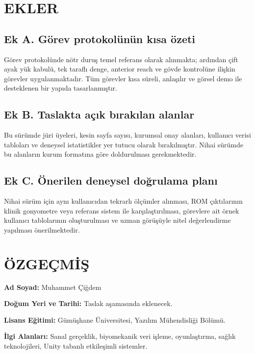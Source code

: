 \documentclass[12pt,a4paper,oneside]{report}
\newcommand{\thesisauthor}{Muhammet Çiğdem}
\begin{document}
\chapter{EKLER}

\section{Ek A. Görev protokolünün kısa özeti}
Görev protokolünde nötr duruş temel referans olarak alınmakta; ardından çift ayak yük kabulü, tek taraflı denge, anterior reach ve gövde kontrolüne ilişkin görevler uygulanmaktadır. Tüm görevler kısa süreli, anlaşılır ve görsel demo ile desteklenen bir yapıda tasarlanmıştır.

\section{Ek B. Taslakta açık bırakılan alanlar}
Bu sürümde jüri üyeleri, kesin sayfa sayısı, kurumsal onay alanları, kullanıcı verisi tabloları ve deneysel istatistikler yer tutucu olarak bırakılmıştır. Nihai sürümde bu alanların kurum formatına göre doldurulması gerekmektedir.

\section{Ek C. Önerilen deneysel doğrulama planı}
Nihai sürüm için aynı kullanıcıdan tekrarlı ölçümler alınması, ROM çıktılarının klinik gonyometre veya referans sistem ile karşılaştırılması, görevlere ait örnek kullanıcı tablolarının oluşturulması ve uzman görüşüyle nitel değerlendirme yapılması önerilmektedir.

\chapter{ÖZGEÇMİŞ}
\noindent\textbf{Ad Soyad:} \thesisauthor

\noindent\textbf{Doğum Yeri ve Tarihi:} Taslak aşamasında eklenecek.

\noindent\textbf{Lisans Eğitimi:} Gümüşhane Üniversitesi, Yazılım Mühendisliği Bölümü.

\noindent\textbf{İlgi Alanları:} Sanal gerçeklik, biyomekanik veri işleme, oyunlaştırma, sağlık teknolojileri, Unity tabanlı etkileşimli sistemler.
\end{document}
